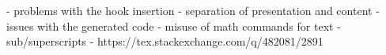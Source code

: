 - problems with the hook insertion
  - separation of presentation and content
- issues with the generated code
  - misuse of math commands for text 
- sub/superscripts - https://tex.stackexchange.com/q/482081/2891
